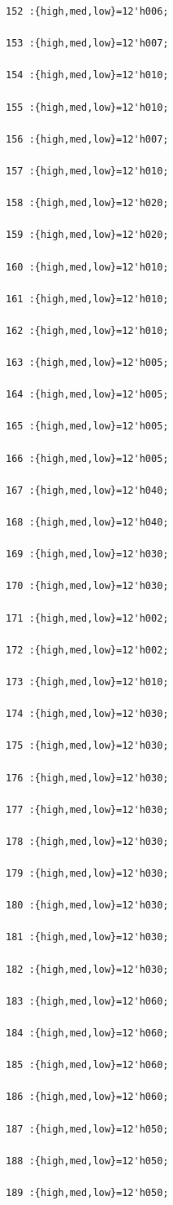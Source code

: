 \documentclass[UTF8]{ctexart}
\begin{document}
\begin{verbatim}
152 :{high,med,low}=12'h006;

153 :{high,med,low}=12'h007;

154 :{high,med,low}=12'h010;

155 :{high,med,low}=12'h010;

156 :{high,med,low}=12'h007;

157 :{high,med,low}=12'h010;

158 :{high,med,low}=12'h020;

159 :{high,med,low}=12'h020;

160 :{high,med,low}=12'h010;

161 :{high,med,low}=12'h010;

162 :{high,med,low}=12'h010;

163 :{high,med,low}=12'h005;

164 :{high,med,low}=12'h005;

165 :{high,med,low}=12'h005;

166 :{high,med,low}=12'h005;

167 :{high,med,low}=12'h040;

168 :{high,med,low}=12'h040;

169 :{high,med,low}=12'h030;

170 :{high,med,low}=12'h030;

171 :{high,med,low}=12'h002;

172 :{high,med,low}=12'h002;

173 :{high,med,low}=12'h010;

174 :{high,med,low}=12'h030;

175 :{high,med,low}=12'h030;

176 :{high,med,low}=12'h030;

177 :{high,med,low}=12'h030;

178 :{high,med,low}=12'h030;

179 :{high,med,low}=12'h030;

180 :{high,med,low}=12'h030;

181 :{high,med,low}=12'h030;

182 :{high,med,low}=12'h030;

183 :{high,med,low}=12'h060;

184 :{high,med,low}=12'h060;

185 :{high,med,low}=12'h060;

186 :{high,med,low}=12'h060;

187 :{high,med,low}=12'h050;

188 :{high,med,low}=12'h050;

189 :{high,med,low}=12'h050;


\end{verbatim}
\end{document}
